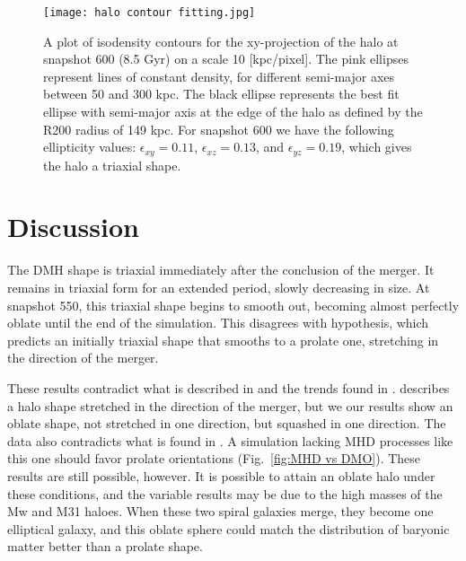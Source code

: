 \documentclass[fleqn,usenatbib]{mnras}
\begin{document}
\begin{figure}
	\texttt{[image: halo contour fitting.jpg]}
    \caption{A plot of isodensity contours for the xy-projection of the halo at snapshot 600 (8.5 Gyr) on a scale 10 [kpc/pixel]. The pink ellipses represent lines of constant density, for different semi-major axes between 50 and 300 kpc. The black ellipse represents the best fit ellipse with semi-major axis at the edge of the halo as defined by the R200 radius of 149 kpc. For snapshot 600 we have the following ellipticity values: \begin{math}\epsilon_{xy}=0.11\end{math}, \begin{math}\epsilon_{xz}=0.13\end{math}, and \begin{math}\epsilon_{yz}=0.19\end{math}, which gives the halo a triaxial shape.}            
    \label{fig:contour fitting}
\end{figure}


\section{Discussion}

The DMH shape is triaxial immediately after the conclusion of the merger. It remains in triaxial form for an extended period, slowly decreasing in size. At snapshot 550, this triaxial shape begins to smooth out, becoming almost perfectly oblate until the end of the simulation. This disagrees with hypothesis, which predicts an initially triaxial shape that smooths to a prolate one, stretching in the direction of the merger.

These results contradict what is described in \citet{Despali_2016} and the trends found in \citet{Prada_2019}. \citet{Despali_2016} describes a halo shape stretched in the direction of the merger, but we our results show an oblate shape, not stretched in one direction, but squashed in one direction. The data also contradicts what is found in \citet{Prada_2019}. A simulation lacking MHD processes like this one should favor prolate orientations (Fig.~\ref{fig:MHD vs DMO}). These results are still possible, however. It is possible to attain an oblate halo under these conditions, and the variable results may be due to the high masses of the Mw and M31 haloes. When these two spiral galaxies merge, they become one elliptical galaxy, and this oblate sphere could match the distribution of baryonic matter better than a prolate shape.
\end{document}
